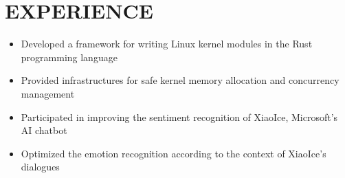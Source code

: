 \documentclass[11pt,a4paper,roman]{moderncv} %
\begin{document}


\section{EXPERIENCE}


{
	\begin{itemize}
		\item Developed a framework for writing Linux kernel modules in the Rust programming language
		\item Provided infrastructures for safe kernel memory allocation and concurrency management
	\end{itemize}
}

{
    \begin{itemize}
    	\item Participated in improving the sentiment recognition of XiaoIce, Microsoft's AI chatbot
	\item Optimized the emotion recognition according to the context of XiaoIce's dialogues
	\end{itemize}
}
\end{document}
